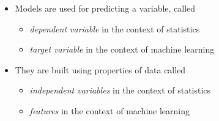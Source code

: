 
\begin{itemize}
\item Models are used for predicting a variable, called
  \begin{itemize}
  \item \emph{dependent variable} in the context of statistics
  \item \emph{target variable} in the context of machine learning
  \end{itemize}
\item They are built using properties of data called
  \begin{itemize}
  \item \emph{independent variables} in the context of statistics
  \item \emph{features} in the context of machine learning
  \end{itemize}
\end{itemize}

\newpage




